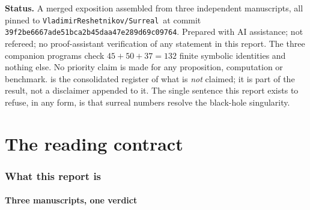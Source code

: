 \documentclass[11pt,letterpaper]{article}
\numberwithin{equation}{section}
\theoremstyle{definition}
\theoremstyle{remark}
\newcommand{\Repo}{\texttt{VladimirReshetnikov/Surreal}}
\newcommand{\Commit}{\nolinkurl{39f2be6667ade51bca2b45daa47e289d69c09764}}
\begin{document}
\begin{titlepage}
\begin{minipage}{0.93\textwidth}
\begin{abstract}
What survives on the positive side is substantial and precisely delimited:
exact curvature and infall identities, a small-angular-momentum crossover with
an exact quadrature, inner and outer Hahn support criteria for a regular core
that are sharp at $\alpha=2/3$, formal and coefficientwise Einstein reduction
theorems with counterexamples showing their hypotheses cannot be dropped,
finite-dimensional surcomplex Hermitian and quantum-shadow theorems with their
conditioning boundary, and an explicit incompatibility between the canonical
integer-part global phase and a normalized scalar derivation. None of it is a
singularity resolution, and none of it is claimed to be.
\end{abstract}
\end{minipage}
\vfill
\begin{minipage}{0.93\textwidth}\small
\textbf{Status.} A merged exposition assembled from three independent
manuscripts, all pinned to \Repo\ at commit \Commit. Prepared with AI
assistance; not refereed; no proof-assistant verification of any statement in
this report. The three companion programs check $45+50+37=132$ finite symbolic
identities and nothing else. No priority claim is made for any proposition,
computation or benchmark.  is the consolidated
register of what is \emph{not} claimed; it is part of the result, not a
disclaimer appended to it. The single sentence this report exists to refuse, in
any form, is that surreal numbers resolve the black-hole singularity.
\end{minipage}
\end{titlepage}
\hypersetup{pageanchor=true}
\begingroup\small\setlength{\parskip}{0pt}
\tableofcontents
\endgroup
\clearpage
{}
\part{The reading contract}
\label{phys:part:contract}

\section{What this report is}
\label{phys:sec:intro}

\subsection{Three manuscripts, one verdict}
\label{phys:sub:three}
\end{document}
